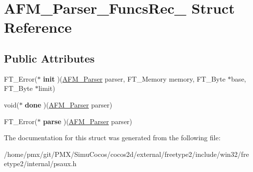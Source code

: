 \hypertarget{structAFM__Parser__FuncsRec__}{}\section{A\+F\+M\+\_\+\+Parser\+\_\+\+Funcs\+Rec\+\_\+ Struct Reference}
\label{structAFM__Parser__FuncsRec__}
\subsection*{Public Attributes}
\begin{DoxyCompactItemize}
\item 
\mbox{\label{structAFM__Parser__FuncsRec___a7d5c1422c71ef00984f1207ebfb0b082}} 
F\+T\+\_\+\+Error($\ast$ {\bfseries init} )(\hyperlink{structAFM__ParserRec__}{A\+F\+M\+\_\+\+Parser} parser, F\+T\+\_\+\+Memory memory, F\+T\+\_\+\+Byte $\ast$base, F\+T\+\_\+\+Byte $\ast$limit)
\item 
\mbox{\label{structAFM__Parser__FuncsRec___af4e8bc33b14d14b47d13caf0a2449d1b}} 
void($\ast$ {\bfseries done} )(\hyperlink{structAFM__ParserRec__}{A\+F\+M\+\_\+\+Parser} parser)
\item 
\mbox{\label{structAFM__Parser__FuncsRec___a2cd41be89cf12f9227c6f18220cbe2f3}} 
F\+T\+\_\+\+Error($\ast$ {\bfseries parse} )(\hyperlink{structAFM__ParserRec__}{A\+F\+M\+\_\+\+Parser} parser)
\end{DoxyCompactItemize}


The documentation for this struct was generated from the following file\+:\begin{DoxyCompactItemize}
\item 
/home/pmx/git/\+P\+M\+X/\+Simu\+Cocos/cocos2d/external/freetype2/include/win32/freetype2/internal/psaux.\+h\end{DoxyCompactItemize}
